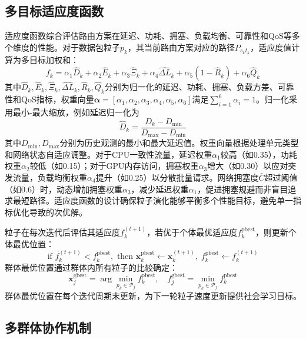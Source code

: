 \subsection{多目标适应度函数}

适应度函数综合评估路由方案在延迟、功耗、拥塞、负载均衡、可靠性和QoS等多个维度的性能。对于数据包粒子$p_k$，其当前路由方案对应的路径$P_{s_k t_k}$，适应度值计算为多目标加权和：
\begin{equation}
f_k = \alpha_1 \hat{D}_k + \alpha_2 \hat{E}_k + \alpha_3 \hat{\Xi}_k + \alpha_4 \hat{\Delta L}_k + \alpha_5 (1 - \hat{R}_k) + \alpha_6 \hat{Q}_k
\end{equation}
其中$\hat{D}_k, \hat{E}_k, \hat{\Xi}_k, \hat{\Delta L}_k, \hat{R}_k, \hat{Q}_k$分别为归一化的延迟、功耗、拥塞、负载方差、可靠性和QoS指标，权重向量$\boldsymbol{\alpha} = [\alpha_1, \alpha_2, \alpha_3, \alpha_4, \alpha_5, \alpha_6]$满足$\sum_{i=1}^6 \alpha_i = 1$。归一化采用最小-最大缩放，例如延迟归一化为
\begin{equation}
\hat{D}_k = \frac{D_k - D_{\min}}{D_{\max} - D_{\min}}
\end{equation}
其中$D_{\min}, D_{\max}$分别为历史观测的最小和最大延迟值。权重向量根据处理单元类型和网络状态自适应调整。对于CPU一致性流量，延迟权重$\alpha_1$较高（如0.35），功耗权重$\alpha_2$较低（如0.15）；对于GPU内存访问，拥塞权重$\alpha_3$增大（如0.30）以应对突发流量，负载均衡权重$\alpha_4$提升（如0.25）以分散批量请求。网络拥塞度$\bar{C}$超过阈值（如0.6）时，动态增加拥塞权重$\alpha_3$，减少延迟权重$\alpha_1$，促进拥塞规避而非盲目追求最短路径。适应度函数的设计确保粒子演化能够平衡多个性能目标，避免单一指标优化导致的次优解。

粒子在每次迭代后评估其适应度$f_k^{(t+1)}$，若优于个体最优适应度$f_k^{\text{pbest}}$，则更新个体最优位置：
\begin{equation}
\text{if } f_k^{(t+1)} < f_k^{\text{pbest}}, \text{ then } \mathbf{x}_k^{\text{pbest}} \leftarrow \mathbf{x}_k^{(t+1)}, \; f_k^{\text{pbest}} \leftarrow f_k^{(t+1)}
\end{equation}
群体最优位置通过群体内所有粒子的比较确定：
\begin{equation}
\mathbf{x}_j^{\text{gbest}} = \arg\min_{p_k \in \mathcal{P}_j} f_k^{\text{pbest}}, \quad f_j^{\text{gbest}} = \min_{p_k \in \mathcal{P}_j} f_k^{\text{pbest}}
\end{equation}
群体最优位置在每个迭代周期末更新，为下一轮粒子速度更新提供社会学习目标。

\subsection{多群体协作机制}

